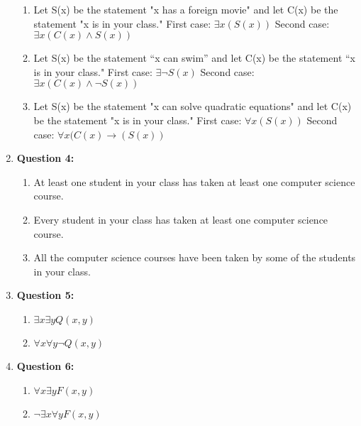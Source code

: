 \documentclass[11pt]{article}
\begin{document}
\begin{enumerate}
\begin{enumerate}[label=(\alph*)]
 \item
 Let S(x) be the statement "x has a foreign movie" and let C(x) be the statement "x is in your class." First case: $\exists x(S(x))$ Second case: $\exists x(C(x) \land S(x))$
 
 \item
 Let S(x) be the statement “x can swim” and let C(x) be the statement “x is in your class." First case: $\exists \lnot S(x)$ Second case: $\exists x (C(x) \land \lnot S(x))$
 
 \item
 Let S(x) be the statement "x can solve quadratic equations" and let C(x) be the statement "x is in your class." First case: $\forall x(S(x))$ Second case: $\forall x (C(x)\rightarrow (S(x))$
    
\end{enumerate}

\item
\textbf{Question 4:}

\begin{enumerate}[label=(\alph*)]
\item
At least one student in your class has taken at least one computer science course. 

\item
Every student in your class has taken at least one computer science course. 

\item
All the computer science courses have been taken by some of the students in your class. 

\end{enumerate}

\item
\textbf{Question 5:}

\begin{enumerate}[label=(\alph*)]
\item
$\exists x \exists y Q(x,y)$

\item
$\forall x \forall y \lnot Q(x,y)$

\end{enumerate}

\item
\textbf{Question 6:}

\begin{enumerate}[label=(\alph*)]
\item
$\forall x \exists y F(x,y)$

\item
$\lnot \exists x \forall y F(x,y)$


\end{enumerate}
\end{enumerate}
\end{document}
